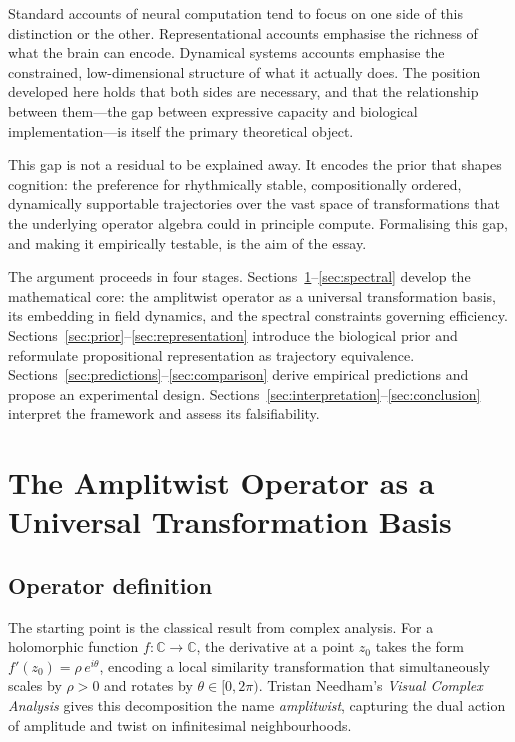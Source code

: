 \documentclass[12pt, a4paper]{article}
\theoremstyle{remark}
\theoremstyle{definition}
\begin{document}
Standard accounts of neural computation tend to focus on one side of this distinction or
the other.  Representational accounts emphasise the richness of what the brain can encode.
Dynamical systems accounts emphasise the constrained, low-dimensional structure of what it
actually does.  The position developed here holds that both sides are necessary, and that
the relationship between them---the gap between expressive capacity and biological
implementation---is itself the primary theoretical object.

This gap is not a residual to be explained away.  It encodes the prior that shapes
cognition: the preference for rhythmically stable, compositionally ordered, dynamically
supportable trajectories over the vast space of transformations that the underlying operator
algebra could in principle compute.  Formalising this gap, and making it empirically
testable, is the aim of the essay.

The argument proceeds in four stages.  Sections~\ref{sec:operator}--\ref{sec:spectral}
develop the mathematical core: the amplitwist operator as a universal transformation basis,
its embedding in field dynamics, and the spectral constraints governing efficiency.
Sections~\ref{sec:prior}--\ref{sec:representation} introduce the biological prior and
reformulate propositional representation as trajectory equivalence.
Sections~\ref{sec:predictions}--\ref{sec:comparison} derive empirical predictions and
propose an experimental design.  Sections~\ref{sec:interpretation}--\ref{sec:conclusion}
interpret the framework and assess its falsifiability.

\section{The Amplitwist Operator as a Universal Transformation Basis}
\label{sec:operator}

\subsection{Operator definition}

The starting point is the classical result from complex analysis.  For a holomorphic
function $f \colon \mathbb{C} \to \mathbb{C}$, the derivative at a point $z_0$ takes the
form $f'(z_0) = \rho\, e^{i\theta}$, encoding a local similarity transformation that
simultaneously scales by $\rho > 0$ and rotates by $\theta \in [0,2\pi)$.  Tristan
Needham's \emph{Visual Complex Analysis} gives this decomposition the name
\emph{amplitwist}, capturing the dual action of amplitude and twist on infinitesimal
neighbourhoods.
\end{document}
